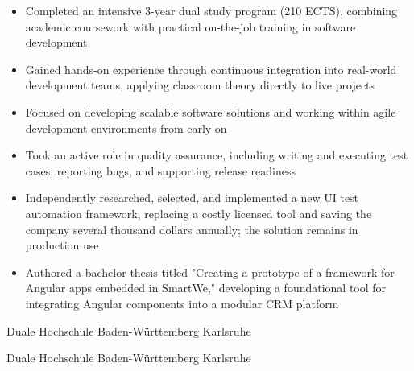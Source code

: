\documentclass[10pt, a4paper]{cvhari}
\begin{document}
    \vspace{0.2em}
    \begin{itemize}
        \item Completed an intensive 3-year dual study program (210 ECTS), combining academic coursework with practical on-the-job training in software development

        \item Gained hands-on experience through continuous integration into real-world development teams, applying classroom theory directly to live projects

        \item Focused on developing scalable software solutions and working within agile development environments from early on

        \item Took an active role in quality assurance, including writing and executing test cases, reporting bugs, and supporting release readiness

        \item Independently researched, selected, and implemented a new UI test automation framework, replacing a costly licensed tool and saving the company several thousand dollars annually; the solution remains in production use

        \item Authored a bachelor thesis titled "Creating a prototype of a framework for Angular apps embedded in SmartWe," developing a foundational tool for integrating Angular components into a modular CRM platform
    \end{itemize}



\medskip

    \bigskip
    
    {Duale Hochschule Baden-Württemberg Karlsruhe}\par
    
    \smallskip 
    \dividergray
    \smallskip
    
    {Duale Hochschule Baden-Württemberg Karlsruhe}\par
    \medskip

\medskip
\end{document}
